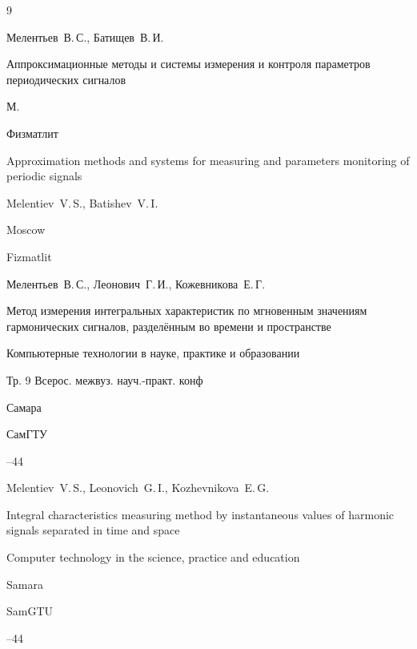 \begin{thebibliography}{9}




\by Мелентьев~В.\,С., Батищев~В.\,И.

\book Аппроксимационные методы и системы измерения и контроля параметров периодических сигналов

\publaddr М.

\publ Физматлит



\misctransl

\book Approximation methods and systems for measuring and parameters  monitoring  of periodic signals

\by Melentiev~V.\,S., Batishev~V.\,I.

\publaddr Moscow

\publ Fizmatlit








\by Мелентьев~В.\,С., Леонович~Г.\,И., Кожевникова~Е.\,Г.

\paper Метод измерения интегральных характеристик по мгновенным значениям гармонических сигналов, разделённым  во времени и пространстве

\inbook Компьютерные технологии в науке, практике и образовании

\bookinfo Тр. 9 Всерос. межвуз. науч.-практ. конф

\publaddr Самара

\publ СамГТУ


--44

\misctransl

\by Melentiev~V.\,S., Leonovich~G.\,I., Kozhevnikova~E.\,G.

\paper Integral characteristics measuring method by instantaneous values of harmonic signals separated in time and space

\inbook Computer technology in the science, practice and education

\publaddr Samara

\publ SamGTU


--44







\end{thebibliography}





